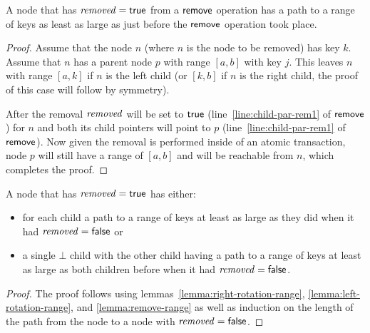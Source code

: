\begin{lemma}
\label{lemma:remove-range}
A node that has $\ms{removed}=\lit{true}$ from a $\act{remove}$ operation has a path to a range of keys as least as large as just before the $\act{remove}$ operation took place.
\end{lemma}
\begin{proof}
Assume that the node $n$ (where $n$ is the node to be removed) has key $k$.
Assume that $n$ has a parent node $p$ with range $[a, b]$ with key $j$.
This leaves $n$ with range $[a, k]$ if $n$ is the left child (or $[k, b]$ if $n$ is the right child, the proof of this case will follow by symmetry).

After the removal $\ms{removed}$ will be set to $\lit{true}$ (line~\ref{line:child-par-rem1} of $\act{remove}$) for $n$ and both its child pointers will point
to $p$ (line~\ref{line:child-par-rem1}%
of $\act{remove}$).
Now given the removal is performed inside of an atomic transaction,
node $p$ will still have a range of $[a, b]$ and will be reachable from $n$, which completes the proof.
\end{proof}

\begin{lemma}
\label{lemma:range}
A node that has $\ms{removed}=\lit{true}$ has either:
\begin{itemize}
\item for each child a path to a range of keys at least as large as they did when it had $\ms{removed}=\lit{false}$ or
\item a single $\bot$ child with the other child having a path to a range of keys at least as large as both children before when it had $\ms{removed}=\lit{false}$.
\end{itemize}
\end{lemma}
\begin{proof}
The proof follows using lemmas~\ref{lemma:right-rotation-range}, \ref{lemma:left-rotation-range}, and \ref{lemma:remove-range} as well as induction on the length
of the path from the node to a node with $\ms{removed}=\lit{false}$.
\end{proof}


